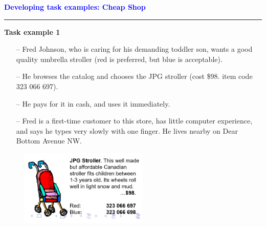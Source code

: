 \documentclass[pdf]{beamer}
\begin{document}
{%
\begin{frame}
	\vspace{8mm}
	\textcolor{Blue}{\textbf{\Large{Developing task examples: Cheap Shop}}}
    \textcolor{red}{\rule{10cm}{1mm}}


     \bigskip
     \textbf{Task example 1}
   
          \begin{itemize}
        \item[\textcolor{black}{--}] Fred Johnson, who is caring for his demanding toddler son, wants a good quality umbrella stroller (red is preferred, but blue is acceptable). 
        \bigskip
        \item[\textcolor{black}{--}] He browses the catalog and chooses the JPG stroller (cost \$98. item code 323 066 697).
        \bigskip
        \item[\textcolor{black}{--}] He pays for it in cash, and uses it immediately.
        \bigskip
        \item[\textcolor{black}{--}] Fred is a first-time customer to this store, has little computer experience, and says he types very slowly with one finger. He lives nearby on Dear Bottom Avenue NW.


     \end{itemize}
     \begin{figure}[b]
    	\includegraphics[scale = 0.7, right]{8_Picture1.png}
    \end{figure}
\end{frame}}
\end{document}
